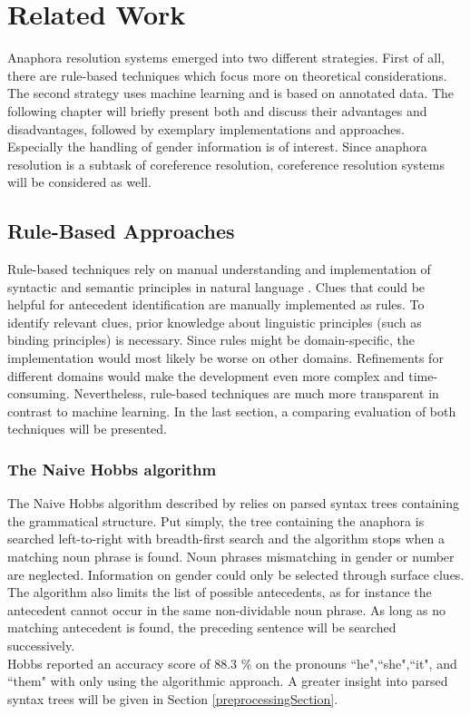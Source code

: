 \chapter{Related Work}
\label{sec:Related Work}

Anaphora resolution systems emerged into two different strategies. First of all, there are rule-based techniques which focus more on theoretical considerations. The second strategy uses machine learning and is based on annotated data. The following chapter will briefly present both and discuss their advantages and disadvantages, followed by exemplary implementations and approaches. Especially the handling of gender information is of interest. Since anaphora resolution is a subtask of coreference resolution, coreference resolution systems will be considered as well.

\section{Rule-Based Approaches}
Rule-based techniques rely on manual understanding and implementation of syntactic and semantic principles in natural language \citep{kennedy1996anaphora,mitkov1994integrated,ingria1989computational}. Clues that could be helpful for antecedent identification are manually implemented as rules. To identify relevant clues, prior knowledge about linguistic principles (such as binding principles) is necessary. Since rules might be domain-specific, the implementation would most likely be worse on other domains. Refinements for different domains would make the development even more complex and time-consuming. Nevertheless, rule-based techniques are much more transparent in contrast to machine learning. In the last section, a comparing evaluation of both techniques will be presented.

\subsection{The Naive Hobbs algorithm}
The Naive Hobbs algorithm described by \cite{hobbs1978resolving} relies on parsed syntax trees containing the grammatical structure. Put simply, the tree containing the anaphora is searched left-to-right with breadth-first search and the algorithm stops when a matching noun phrase is found. Noun phrases mismatching in gender or number are neglected. Information on gender could only be selected through surface clues. The algorithm also limits the list of possible antecedents, as for instance the antecedent cannot occur in the same non-dividable noun phrase. As long as no matching antecedent is found, the preceding sentence will be searched successively. \\
Hobbs reported an accuracy score of 88.3 \% on the pronouns ``he",``she",``it", and “them" with only using the algorithmic approach. A greater insight into parsed syntax trees will be given in Section \ref{preprocessingSection}.

